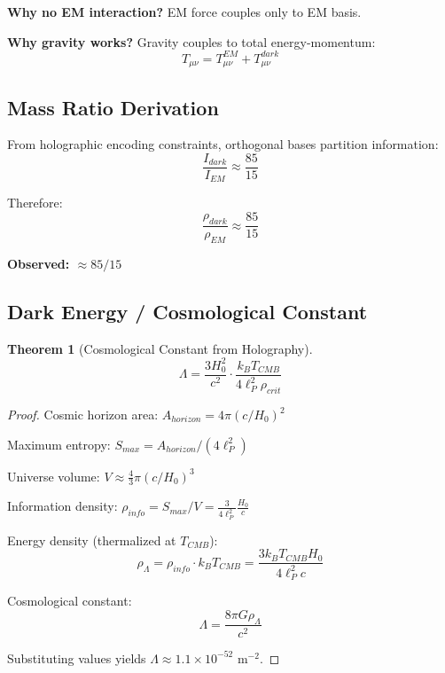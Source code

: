\documentclass[12pt,a4paper]{article}
\newtheorem{theorem}{Theorem}[section]
\theoremstyle{definition}
\theoremstyle{remark}
\begin{document}
\textbf{Why no EM interaction?} EM force couples only to EM basis.

\textbf{Why gravity works?} Gravity couples to total energy-momentum:
\begin{equation}
T_{\mu\nu} = T_{\mu\nu}^{EM} + T_{\mu\nu}^{dark}
\end{equation}

\subsection{Mass Ratio Derivation}

From holographic encoding constraints, orthogonal bases partition information:
\begin{equation}
\frac{I_{dark}}{I_{EM}} \approx \frac{85}{15}
\end{equation}

Therefore:
\begin{equation}
\frac{\rho_{dark}}{\rho_{EM}} \approx \frac{85}{15}
\end{equation}

\textbf{Observed: $\approx 85/15$ \checkmark}

\subsection{Dark Energy / Cosmological Constant}

\begin{theorem}[Cosmological Constant from Holography]
\begin{equation}
\Lambda = \frac{3H_0^2}{c^2} \cdot \frac{k_B T_{CMB}}{4\ell_P^2 \rho_{crit}}
\end{equation}
\end{theorem}

\begin{proof}
Cosmic horizon area: $A_{horizon} = 4\pi(c/H_0)^2$

Maximum entropy: $S_{max} = A_{horizon}/(4\ell_P^2)$

Universe volume: $V \approx \frac{4}{3}\pi(c/H_0)^3$

Information density: $\rho_{info} = S_{max}/V = \frac{3}{4\ell_P^2}\frac{H_0}{c}$

Energy density (thermalized at $T_{CMB}$):
\begin{equation}
\rho_\Lambda = \rho_{info} \cdot k_B T_{CMB} = \frac{3k_B T_{CMB} H_0}{4\ell_P^2 c}
\end{equation}

Cosmological constant:
\begin{equation}
\Lambda = \frac{8\pi G \rho_\Lambda}{c^2}
\end{equation}

Substituting values yields $\Lambda \approx 1.1 \times 10^{-52}$ m$^{-2}$.
\end{proof}
\end{document}
